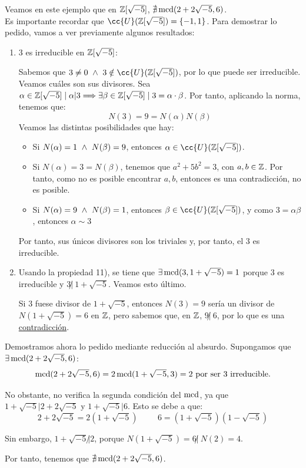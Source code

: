 \begin{ejemplo}
    Veamos en este ejemplo que en $\mathbb Z[\sqrt{-5}]$, $\nexists \operatorname{mcd}(2+2\sqrt{-5}, 6)$.\\

    Es importante recordar que $\cc{U}(\Z[\sqrt{-5}]) = \{-1, 1\}$. Para demostrar lo pedido, vamos a ver previamente algunos resultados:
    \begin{enumerate}
        \item $3$ es irreducible en $\mathbb Z[\sqrt{-5}]$:

        Sabemos que $3\neq0 \y 3 \notin \cc{U}(\Z[\sqrt{-5}])$, por lo que puede ser irreducible. Veamos cuáles son sus divisores. Sea $\alpha \in \mathbb Z[\sqrt{-5}] \mid \alpha|3 \Longrightarrow \exists \beta \in \mathbb Z[\sqrt{-5}] \mid 3=\alpha \cdot \beta$. Por tanto, aplicando la norma, tenemos que:
        $$N(3) = 9 =  N(\alpha)N(\beta)$$
        Veamos las distintas posibilidades que hay:
        \begin{itemize}
            \item Si $N(\alpha)=1 \ \land \  N(\beta) = 9$, entonces $\alpha \in \cc{U}(\Z[\sqrt{-5}])$.
            \item Si $N(\alpha) = 3 = N(\beta)$, tenemos que $a^2+5b^2=3$, con $a,b\in \mathbb Z$. Por tanto, como no es posible encontrar $a,b$, entonces es una contradicción, no es posible.
            \item Si $N(\alpha)=9 \ \land \  N(\beta) = 1$, entonces $\beta \in \cc{U}(\Z[\sqrt{-5}])$, y como $3=\alpha\beta$, entonces $\alpha\sim 3$
        \end{itemize}
        Por tanto, sus únicos divisores son los triviales y, por tanto, el $3$ es irreducible.

        \item Usando la propiedad 11), se tiene que $\exists \operatorname{mcd}(3, 1+\sqrt{-5})=1$ porque $3$ es irreducible y $3\not|~1+\sqrt{-5}$. Veamos esto último.

        Si $3$ fuese divisor de $1+\sqrt{-5}$, entonces $N(3)=9$ sería un divisor de $N(1+\sqrt{-5})=6$ en $\mathbb Z$, pero sabemos que, en $\mathbb Z$, $9\not|~6$, por lo que es una \ul{contradicción}.
    \end{enumerate}

    Demostramos ahora lo pedido mediante reducción al absurdo. Supongamos que $\exists \operatorname{mcd}(2+2\sqrt{-5}, 6)$:
    $$\operatorname{mcd}(2+2\sqrt{-5},6)=2\operatorname{mcd}(1+\sqrt{-5}, 3)=2 \text{ por ser $3$ irreducible.}$$

    No obstante, no verifica la segunda condición del $\operatorname{mcd}$, ya que $1+\sqrt{-5}|2+2\sqrt{-5}$ y $1+\sqrt{-5}|6$. Esto se debe a que:
    \begin{equation*}
        2+2\sqrt{-5} = 2(1+\sqrt{-5}) \hspace{1cm} 6=(1+\sqrt{-5})(1-\sqrt{-5})
    \end{equation*}
    
    Sin embargo, $1+\sqrt{-5}\not|2$, porque $N(1+\sqrt{-5})=6\not|~N(2)=4$.
    
    Por tanto, tenemos que $\nexists \operatorname{mcd}(2+2\sqrt{-5},6)$.
\end{ejemplo}

